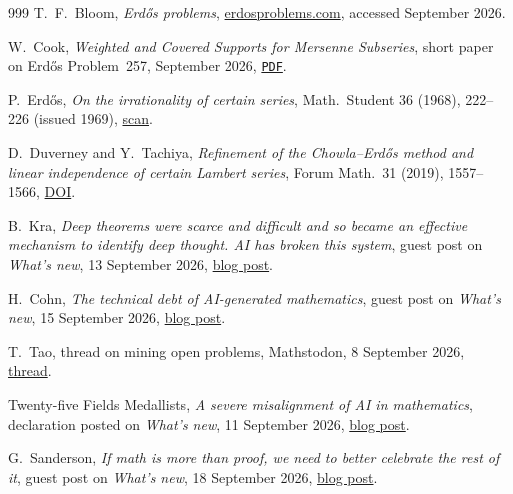 \documentclass[10pt]{article}
\newcommand{\repobase}{https://github.com/wcook04/plectis-erdos}
\newcommand{\repolink}[2]{\href{\repobase/blob/992cf60a27efd8c34f437e347c413bb781d75c32/#1}{\texttt{#2}}}
\begin{document}
\clearpage
\begin{thebibliography}{999}
 T.~F.~Bloom, \emph{Erd\H{o}s problems},
\href{https://www.erdosproblems.com}{erdosproblems.com}, accessed September 2026.

 W.~Cook, \emph{Weighted and Covered Supports for Mersenne Subseries}, short paper on Erd\H{o}s Problem~257, September 2026,
\repolink{paper/257/erdos-257-mersenne-support-subseries.pdf}{PDF}.

 P.~Erd\H{o}s, \emph{On the irrationality of certain
series}, Math.\ Student 36 (1968), 222--226 (issued 1969),
\href{https://users.renyi.hu/~p_erdos/1969-09.pdf}{scan}.

 D.~Duverney and Y.~Tachiya, \emph{Refinement of the
Chowla--Erd\H{o}s method and linear independence of certain Lambert series},
Forum Math.\ 31 (2019), 1557--1566,
\href{https://doi.org/10.1515/forum-2018-0299}{DOI}.

 B.~Kra, \emph{Deep theorems were scarce and difficult and so
became an effective mechanism to identify deep thought. AI has broken this
system}, guest post on \emph{What's new}, 13 September 2026,
\href{https://terrytao.wordpress.com/2026/09/13/deep-theorems-were-scarce-and-difficult-and-so-became-an-effective-mechanism-to-identify-deep-thought-ai-has-broken-this-system/}{blog post}.

 H.~Cohn, \emph{The technical debt of AI-generated mathematics},
guest post on \emph{What's new}, 15 September 2026,
\href{https://terrytao.wordpress.com/2026/09/15/the-technical-debt-of-ai-generated-mathematics/}{blog post}.

 T.~Tao, thread on mining open problems, Mathstodon,
8 September 2026, \href{https://mathstodon.xyz/@tao/117237320796901560}{thread}.

 Twenty-five Fields Medallists, \emph{A severe
misalignment of AI in mathematics}, declaration posted on \emph{What's new},
11 September 2026,
\href{https://terrytao.wordpress.com/2026/09/11/a-severe-misalignment-of-ai-in-mathematics/}{blog post}.

 G.~Sanderson, \emph{If math is more than proof, we need to
better celebrate the rest of it}, guest post on \emph{What's new}, 18 September
2026, \href{https://terrytao.wordpress.com/2026/09/18/if-math-is-more-than-proof-we-need-to-better-celebrate-the-rest-of-it/}{blog post}.


\end{thebibliography}
\end{document}
